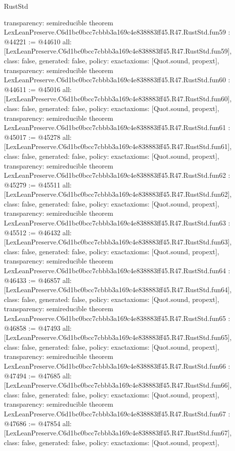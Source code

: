 \begin{lexlean}{RustStd}
\begin{coremodule}
{  transparency: semireducible
}
theorem LexLeanPreserve.C6d1bc0bcc7cbbb3a169c4e838883ff45.R47.RustStd.fun59 : @44221 := @44610 {
  all: [LexLeanPreserve.C6d1bc0bcc7cbbb3a169c4e838883ff45.R47.RustStd.fun59],
  class: false,
  generated: false,
  policy: exact{axioms: [Quot.sound, propext]},
  transparency: semireducible
}
theorem LexLeanPreserve.C6d1bc0bcc7cbbb3a169c4e838883ff45.R47.RustStd.fun60 : @44611 := @45016 {
  all: [LexLeanPreserve.C6d1bc0bcc7cbbb3a169c4e838883ff45.R47.RustStd.fun60],
  class: false,
  generated: false,
  policy: exact{axioms: [Quot.sound, propext]},
  transparency: semireducible
}
theorem LexLeanPreserve.C6d1bc0bcc7cbbb3a169c4e838883ff45.R47.RustStd.fun61 : @45017 := @45278 {
  all: [LexLeanPreserve.C6d1bc0bcc7cbbb3a169c4e838883ff45.R47.RustStd.fun61],
  class: false,
  generated: false,
  policy: exact{axioms: [Quot.sound, propext]},
  transparency: semireducible
}
theorem LexLeanPreserve.C6d1bc0bcc7cbbb3a169c4e838883ff45.R47.RustStd.fun62 : @45279 := @45511 {
  all: [LexLeanPreserve.C6d1bc0bcc7cbbb3a169c4e838883ff45.R47.RustStd.fun62],
  class: false,
  generated: false,
  policy: exact{axioms: [Quot.sound, propext]},
  transparency: semireducible
}
theorem LexLeanPreserve.C6d1bc0bcc7cbbb3a169c4e838883ff45.R47.RustStd.fun63 : @45512 := @46432 {
  all: [LexLeanPreserve.C6d1bc0bcc7cbbb3a169c4e838883ff45.R47.RustStd.fun63],
  class: false,
  generated: false,
  policy: exact{axioms: [Quot.sound, propext]},
  transparency: semireducible
}
theorem LexLeanPreserve.C6d1bc0bcc7cbbb3a169c4e838883ff45.R47.RustStd.fun64 : @46433 := @46857 {
  all: [LexLeanPreserve.C6d1bc0bcc7cbbb3a169c4e838883ff45.R47.RustStd.fun64],
  class: false,
  generated: false,
  policy: exact{axioms: [Quot.sound, propext]},
  transparency: semireducible
}
theorem LexLeanPreserve.C6d1bc0bcc7cbbb3a169c4e838883ff45.R47.RustStd.fun65 : @46858 := @47493 {
  all: [LexLeanPreserve.C6d1bc0bcc7cbbb3a169c4e838883ff45.R47.RustStd.fun65],
  class: false,
  generated: false,
  policy: exact{axioms: [Quot.sound, propext]},
  transparency: semireducible
}
theorem LexLeanPreserve.C6d1bc0bcc7cbbb3a169c4e838883ff45.R47.RustStd.fun66 : @47494 := @47685 {
  all: [LexLeanPreserve.C6d1bc0bcc7cbbb3a169c4e838883ff45.R47.RustStd.fun66],
  class: false,
  generated: false,
  policy: exact{axioms: [Quot.sound, propext]},
  transparency: semireducible
}
theorem LexLeanPreserve.C6d1bc0bcc7cbbb3a169c4e838883ff45.R47.RustStd.fun67 : @47686 := @47854 {
  all: [LexLeanPreserve.C6d1bc0bcc7cbbb3a169c4e838883ff45.R47.RustStd.fun67],
  class: false,
  generated: false,
  policy: exact{axioms: [Quot.sound, propext]},
}
\end{coremodule}
\end{lexlean}

